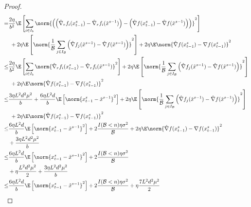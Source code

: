 \begin{proof}
\begin{align}
   = &\notag\frac{2\eta}{b^2}\E\left[\sum_{i\in I_b}\norm{\left(\left(\hat{\nabla}_r f_i(x_{t-1}^s)-\hat{\nabla}_r f_i(\tilde{x}^{s-1})\right) - \left({\hat{\nabla}} f(x_{t-1}^s) - \hat{\nabla} f(\tilde{x}^{s-1}) \right)\right)}^2\right]\\
   &\,\, \label{RandSGE-var-estimate-lem-3}+ 2\eta \E \left[ \norm{\frac{1}{\mathcal{B}}\sum_{j\in I_\mathcal{B}}\left(\hat{\nabla} f_j(\tilde{x}^{s-1}) - \hat{\nabla} f(\tilde{x}^{s-1})\right)}^2\right]+2\eta \E \norm{\hat{\nabla} f(x_{t-1}^s)-\nabla f(x_{t-1}^s)}^2\\
   \leq  &\frac{2\eta}{b^2}\E\left[\sum_{i\in I_b}\norm{\hat{\nabla}_r f_i(x_{t-1}^s)-\hat{\nabla}_r f_i(\tilde{x}^{s-1})}^2\right]+ 2\eta \E \left[ \norm{\frac{1}{\mathcal{B}}\sum_{j\in I_{\mathcal{B}}}\left(\hat{\nabla} f_j(\tilde{x}^{s-1}) - \hat{\nabla} f(\tilde{x}^{s-1})\right)}^2\right]\notag\\
   &\,\,\label{RandSGE-var-estimate-lem-4}+2\eta \E \norm{\hat{\nabla} f(x_{t-1}^s)-\nabla f(x_{t-1}^s)}^2\\
    \leq  &\frac{3 \eta L^2 d^2 \mu^2}{b} + \frac{6\eta L^2 d}{b}\E\left[\norm{x_{t-1}^s-\tilde{x}^{s-1}}^2\right]+ 2\eta \E \left[ \norm{\frac{1}{\mathcal{B}}\sum_{j\in I_{\mathcal{B}}}\left(\hat{\nabla} f_j(\tilde{x}^{s-1}) - \hat{\nabla} f(\tilde{x}^{s-1})\right)}^2\right]\notag\\
   &\,\,\label{RandSGE-var-estimate-lem-5}+2\eta \E \norm{\hat{\nabla} f(x_{t-1}^s)-\nabla f(x_{t-1}^s)}^2\\
   \leq  &\label{RandSGE-var-estimate-lem-6p}\frac{6\eta L^2d}{b}\E\left[\norm{x_{t-1}^s-\tilde{x}^{s-1}}^2\right]+ 2\frac{I(\mathcal{B} < n)\eta \sigma ^2}{\mathcal{B}}+2\eta \E \norm{\hat{\nabla} f(x_{t-1}^s)-\nabla f(x_{t-1}^s)}^2\notag\\
   & + \frac{3 \eta L^2 d^2 \mu^2}{b}\\
   \leq  &\frac{6\eta L^2 d}{b}\E\left[\norm{x_{t-1}^s-\tilde{x}^{s-1}}^2\right]+ 2\frac{I(\mathcal{B} < n)\eta \sigma ^2}{\mathcal{B}}\notag\\
   &\label{RandSGE-var-estimate-lem-6} +\eta \frac{L^2d^2\mu^2}{2}+ \frac{3 \eta L^2 d^2 \mu^2}{b}\\
   \leq  &\label{RandSGE-var-estimate-lem-7}\frac{6\eta L^2 d}{b}\E\left[\norm{x_{t-1}^s-\tilde{x}^{s-1}}^2\right]+ 2\frac{I(\mathcal{B} < n)\eta \sigma ^2}{\mathcal{B}}+\eta \frac{7L^2 d^2 \mu^2}{2} 
 \end{align}

\end{proof}
